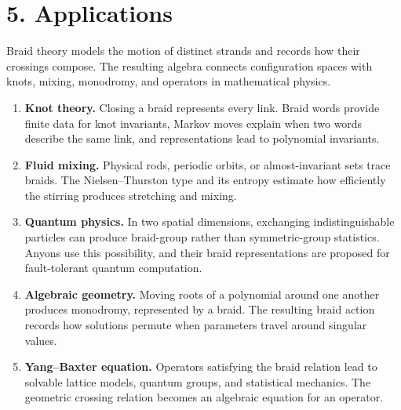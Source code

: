 \section*{5. Applications}
Braid theory models the motion of distinct strands and records how their crossings compose. The resulting algebra connects configuration spaces with knots, mixing, monodromy, and operators in mathematical physics.
\begin{enumerate}[leftmargin=*,itemsep=0.35em]
\item \textbf{Knot theory.} Closing a braid represents every link. Braid words provide finite data for knot invariants, Markov moves explain when two words describe the same link, and representations lead to polynomial invariants.
\item \textbf{Fluid mixing.} Physical rods, periodic orbits, or almost-invariant sets trace braids. The Nielsen--Thurston type and its entropy estimate how efficiently the stirring produces stretching and mixing.
\item \textbf{Quantum physics.} In two spatial dimensions, exchanging indistinguishable particles can produce braid-group rather than symmetric-group statistics. Anyons use this possibility, and their braid representations are proposed for fault-tolerant quantum computation.
\item \textbf{Algebraic geometry.} Moving roots of a polynomial around one another produces monodromy, represented by a braid. The resulting braid action records how solutions permute when parameters travel around singular values.
\item \textbf{Yang--Baxter equation.} Operators satisfying the braid relation lead to solvable lattice models, quantum groups, and statistical mechanics. The geometric crossing relation becomes an algebraic equation for an operator.
\end{enumerate}



